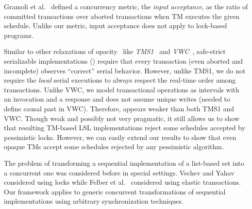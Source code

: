 \documentclass[11pt,pdftex,letterpaper]{article}
\newcommand{\petr}[1]{{\bf (((PK: #1)))}}
\newcommand{\ignore}[1]{}
\begin{document}
Gramoli et al.~\cite{GHF10} defined a concurrency metric, the \emph{input
acceptance}, as the ratio of committed transactions over aborted
transactions when TM executes the given schedule.   
Unlike our metric, input acceptance does not apply to
lock-based programs. 


\ignore{ 
A quite different but popular concurrency notion, called
\emph{disjoint-access parallelism}~\cite{israeli-disjoint}, 
was recently considered in the TM context~\cite{AHM09,EFKMT12}.
A TM is disjoint-access parallel (DAP) if it guarantees 
that two transactions accessing the same meta-data also access 
the same transactional object. 
Our concurrency metric not only applies to lock-based implementations but is also
more fine-grained ones \petr{did not get this point}
as it allows to determine relative concurrency provided 
by different DAP implementations.
}


Similar to other relaxations of opacity~\cite{tm-book} like \emph{TMS1}~\cite{TMS09} and \emph{VWC}~\cite{damien-vw},  
safe-strict serializable implementations () require that every transaction (even aborted and incomplete) observes
``correct'' serial behavior. 
However, unlike TMS1, we do not require the \emph{local} serial executions
to always respect the real-time order among transactions. Unlike VWC, we model transactional
operations as intervals with an invocation and a response and does not
assume unique writes (needed to define causal past in VWC). 
Therefore,  appears weaker than both TMS1 and VWC.
Though weak and possibly not very pragmatic, it still allows us 
to show that resulting TM-based LSL implementations 
reject some schedules accepted by pessimistic locks. 
However, we can easily extend our results to show that even opaque TMs accept
some schedules rejected by any pessimistic algorithm.   
    
The problem of transforming a
sequential implementation of a list-based set into a concurrent
one was considered before in special settings.
Vechev and Yahav~\cite{vechev08} considered using locks while Felber et al.~\cite{FGG09} considered using elastic transactions.
Our framework applies to generic
concurrent transformations of sequential implementations
using arbitrary synchronization techniques. 
\end{document}
